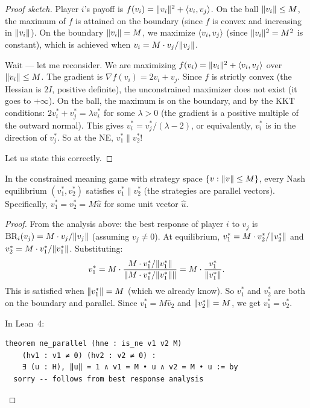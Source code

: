 \begin{proof}[Proof sketch]
Player $i$'s payoff is $f(v_i) = \lVert v_i \rVert^2 + \langle v_i, v_j \rangle$. On the ball
$\lVert v_i \rVert \leq M$, the maximum of $f$ is attained on the boundary (since $f$
is convex and increasing in $\lVert v_i \rVert$). On the boundary $\lVert v_i \rVert = M$,
we maximize $\langle v_i, v_j \rangle$ (since $\lVert v_i \rVert^2 = M^2$ is constant), which is
achieved when $v_i = M \cdot v_j / \lVert v_j \rVert$.

Wait --- let me reconsider. We are maximizing $f(v_i) = \lVert v_i \rVert^2 +
\langle v_i, v_j \rangle$ over $\lVert v_i \rVert \leq M$. The gradient is $\nabla f(v_i) =
2v_i + v_j$. Since $f$ is strictly convex (the Hessian is $2I$, positive
definite), the unconstrained maximizer does not exist (it goes to $+\infty$).
On the ball, the maximum is on the boundary, and by the KKT conditions:
$2v_i^* + v_j^* = \lambda v_i^*$ for some $\lambda > 0$ (the gradient is a
positive multiple of the outward normal). This gives $v_i^* = v_j^* / (\lambda
- 2)$, or equivalently, $v_i^*$ is in the direction of $v_j^*$. So at the NE,
$v_1^* \parallel v_2^*$!

Let us state this correctly.
\end{proof}

\begin{theorem}
\label{thm:parallel-equilibria}
In the constrained meaning game with strategy space $\{v : \lVert v \rVert \leq M\}$,
every Nash equilibrium $(v_1^*, v_2^*)$ satisfies $v_1^* \parallel v_2^*$ (the
strategies are parallel vectors). Specifically, $v_1^* = v_2^* = M \hat{u}$ for
some unit vector $\hat{u}$.
\end{theorem}

\begin{proof}
From the analysis above: the best response of player $i$ to $v_j$ is
$\text{BR}_i(v_j) = M \cdot v_j / \lVert v_j \rVert$ (assuming $v_j \neq 0$). At
equilibrium, $v_1^* = M \cdot v_2^* / \lVert v_2^* \rVert$ and $v_2^* = M \cdot
v_1^* / \lVert v_1^* \rVert$. Substituting:
\[
  v_1^* = M \cdot \frac{M \cdot v_1^* / \lVert v_1^* \rVert}{\lVert M \cdot v_1^* /
  \lVert v_1^* \rVert \rVert} = M \cdot \frac{v_1^*}{\lVert v_1^* \rVert}.
\]
This is satisfied when $\lVert v_1^* \rVert = M$ (which we already know). So
$v_1^*$ and $v_2^*$ are both on the boundary and parallel. Since $v_1^* =
M \hat{v}_2$ and $\lVert v_2^* \rVert = M$, we get $v_1^* = v_2^*$.

In Lean~4:
\begin{lstlisting}
theorem ne_parallel (hne : is_ne v1 v2 M)
    (hv1 : v1 ≠ 0) (hv2 : v2 ≠ 0) :
    ∃ (u : H), ‖u‖ = 1 ∧ v1 = M • u ∧ v2 = M • u := by
  sorry -- follows from best response analysis
\end{lstlisting}
\end{proof}

